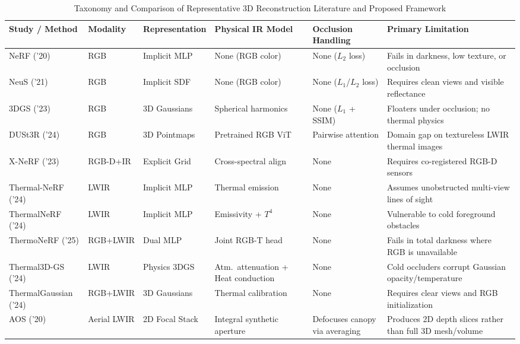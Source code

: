 \documentclass[12pt,letterpaper]{article}
\begin{document}
\begin{table}[!htbp]
  \centering
  \caption{Taxonomy and Comparison of Representative 3D Reconstruction Literature and Proposed Framework}
  \label{tab:lit_review}
  \scriptsize
  \setlength{\tabcolsep}{3pt}
  \renewcommand{\arraystretch}{0.95}
  \begin{tabular}{p{2.7cm}p{1.5cm}p{2.0cm}p{2.6cm}p{2.4cm}p{4.1cm}}
    \toprule
    \textbf{Study / Method} & \textbf{Modality} & \textbf{Representation} & \textbf{Physical IR Model} & \textbf{Occlusion Handling} & \textbf{Primary Limitation} \\
    \midrule
    NeRF \cite{mildenhall2020nerf} ('20) & RGB & Implicit MLP & None (RGB color) & None ($L_2$ loss) & Fails in darkness, low texture, or occlusion \\
    NeuS \cite{wang2021neus} ('21) & RGB & Implicit SDF & None (RGB color) & None ($L_1$/$L_2$ loss) & Requires clean views and visible reflectance \\
    3DGS \cite{kerbl2023gaussians} ('23) & RGB & 3D Gaussians & Spherical harmonics & None ($L_1$ + SSIM) & Floaters under occlusion; no thermal physics \\
    DUSt3R \cite{wang2024dust3r} ('24) & RGB & 3D Pointmaps & Pretrained RGB ViT & Pairwise attention & Domain gap on textureless LWIR thermal images \\
    \midrule
    X-NeRF \cite{zhu2023xnerf} ('23) & RGB-D+IR & Explicit Grid & Cross-spectral align & None & Requires co-registered RGB-D sensors \\
    Thermal-NeRF \cite{ye2024thermalnerf} ('24) & LWIR & Implicit MLP & Thermal emission & None & Assumes unobstructed multi-view lines of sight \\
    ThermalNeRF \cite{lin2024thermalnerf} ('24) & LWIR & Implicit MLP & Emissivity + $T^4$ & None & Vulnerable to cold foreground obstacles \\
    ThermoNeRF \cite{hassan2025thermonerf} ('25) & RGB+LWIR & Dual MLP & Joint RGB-T head & None & Fails in total darkness where RGB is unavailable \\
    Thermal3D-GS \cite{chen2024thermal3dgs} ('24) & LWIR & Physics 3DGS & Atm.\ attenuation + Heat conduction & None & Cold occluders corrupt Gaussian opacity/temperature \\
    ThermalGaussian \cite{lu2024thermalgaussian} ('24) & RGB+LWIR & 3D Gaussians & Thermal calibration & None & Requires clear views and RGB initialization \\
    \midrule
    AOS \cite{schedl2020search} ('20) & Aerial LWIR & 2D Focal Stack & Integral synthetic aperture & Defocuses canopy via averaging & Produces 2D depth slices rather than full 3D mesh/volume \\

\end{tabular}
\end{table}
\end{document}
